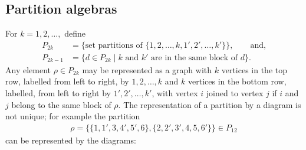 \documentclass[11pt,a4paper,reqno,svgnames]{amsart}
\theoremstyle{plain}
\theoremstyle{definition}
\numberwithin{equation}{section}
\begin{document}
\subsection{Partition algebras}\label{p-a-s}
For $k=1,2,\ldots,$ define 
\begin{align*}
{P}_{2k}&={\lbrace}\text{set partitions of ${\lbrace}1,2,\dots,k,1',2',\dots,k'{\rbrace}$}{\rbrace},\qquad\text{and,}\\
{P}_{2k-1}&={\lbrace}d\in P_{2k}\mid\text{$k$ and $k'$ are in the same block of $d$}{\rbrace}.
\end{align*}
Any element $\rho\in{P}_{2k}$ may be represented as a graph with $k$ vertices in the top row, labelled from left to right, by $1,2,\dots,k$ and $k$ vertices in the bottom row, labelled, from left to right by $1',2',\dots,k'$, with vertex $i$ joined to vertex $j$ if $i$ and $j$ belong to the same block of $\rho$. The representation of a partition by a diagram is not unique; for example the partition 
\begin{align*}
\rho={\lbrace}{\lbrace}1,1',3,4',5',6{\rbrace},{\lbrace}2,2',3',4,5,6'{\rbrace}{\rbrace}\in P_{12}
\end{align*}
can be represented by the diagrams:
\end{document}
